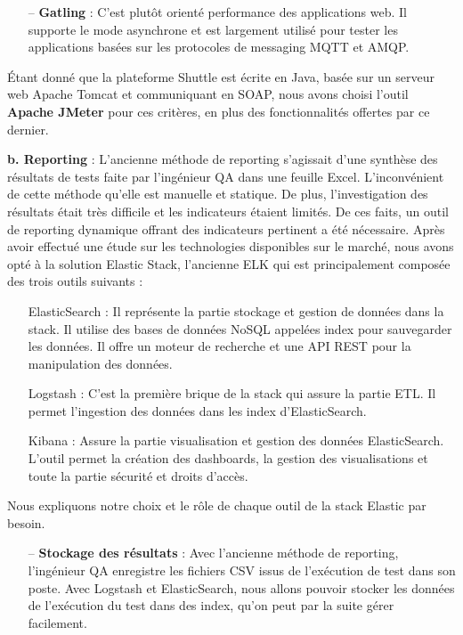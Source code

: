 \begin{spacing}{1.2}
\begin{itemize}
    \item[--] \textbf{Gatling} : C'est plutôt orienté performance des applications web. Il supporte le mode asynchrone et est largement utilisé pour tester les applications basées sur les protocoles de messaging MQTT et AMQP.
\end{itemize}
\vspace{-3mm}
Étant donné que la plateforme Shuttle est écrite en Java, basée sur un serveur web Apache Tomcat et communiquant en SOAP,  nous avons choisi l'outil \textbf{Apache JMeter} pour ces critères, en plus des fonctionnalités offertes par ce dernier.

\textbf{b. Reporting} : L'ancienne méthode de reporting s'agissait d'une synthèse des résultats de tests faite par l'ingénieur QA dans une feuille Excel. L'inconvénient de cette méthode qu'elle est manuelle et statique. De plus, l'investigation des résultats était très difficile et les indicateurs étaient limités. De ces faits, un outil de reporting dynamique offrant des indicateurs pertinent a été nécessaire. Après avoir effectué une étude sur les technologies disponibles  sur le marché, nous avons opté à la solution Elastic Stack, l'ancienne ELK \cite{elasticstack} qui est principalement composée des trois outils suivants :
\vspace{0mm}
\begin{itemize}
    \setlength\itemsep{0em}
     \item[\textbullet] ElasticSearch : Il représente la partie stockage et gestion de données dans la stack. Il utilise des bases de données NoSQL appelées index pour sauvegarder les données. Il offre un moteur de recherche et une API REST pour la manipulation des données. 
    \item[\textbullet] Logstash : C'est la première brique de la stack qui assure la partie ETL. Il permet l'ingestion des données dans les index d'ElasticSearch. 
    \item[\textbullet] Kibana : Assure la partie visualisation et gestion des données ElasticSearch. L'outil permet la création des dashboards, la gestion des visualisations et toute la partie sécurité et droits d'accès.  
\end{itemize}
Nous expliquons notre choix et le rôle de chaque outil de la stack Elastic par besoin.
\begin{itemize}
    \setlength\itemsep{0em}
    \item[--] \textbf{Stockage des résultats} : Avec l'ancienne méthode de reporting, l'ingénieur QA enregistre les fichiers CSV issus de l'exécution de test dans son poste. Avec Logstash et ElasticSearch, nous allons pouvoir stocker les données de l'exécution du test dans des index, qu'on peut par la suite gérer facilement.

\end{itemize}
\end{spacing}
